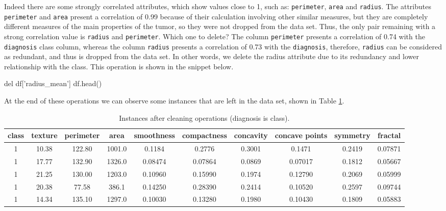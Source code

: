 \documentclass[11pt]{article}
\begin{document}
Indeed there are some strongly correlated attributes, which show values close to 1, such as: \verb$perimeter$, \verb$area$ and \verb$radius$. The attributes \verb$perimeter$ and \verb$area$ present a correlation of 0.99 because of their calculation involving other similar measures, but they are completely different measures of the main properties of the tumor, so they were not dropped from the data set. Thus, the only pair remaining with a strong correlation value is \verb$radius$ and \verb$perimeter$. Which one to delete? The column \verb$perimeter$ presents a correlation of 0.74 with the \verb$diagnosis$ class column, whereas the column \verb$radius$ presents a correlation of 0.73 with the \verb$diagnosis$, therefore, \verb$radius$ can be considered as redundant, and thus is dropped from the data set. In other words, we delete the radius attribute due to its redundancy and lower relationship with the class. This operation is shown in the snippet below.
\\

\begin{python}
del df['radius_mean']
df.head()
\end{python}

At the end of these operations we can observe some instances that are left in the data set, shown in Table \ref{tab:head}.

\begin{center}
\begin{table}
\footnotesize
\begin{tabular}{ |c|c|c|c|c|c|c|c|c|c| } 

\hline
class & texture & perimeter & area & smoothness & compactness & concavity & concave points & symmetry & fractal\\
\hline
1 & 10.38 & 122.80 & 1001.0 & 0.1184 & 0.2776 & 0.3001 & 0.1471 & 0.2419 & 0.07871 \\ 
1 & 17.77 & 132.90 & 1326.0 & 0.08474 & 0.07864 & 0.0869 & 0.07017 & 0.1812 & 0.05667 \\
1 & 21.25 & 130.00 & 1203.0 & 0.10960 & 0.15990 & 0.1974 & 0.12790 & 0.2069 & 0.05999 \\
1 & 20.38 & 77.58 & 386.1 & 0.14250 & 0.28390 & 0.2414 & 0.10520 & 0.2597 & 0.09744 \\
1 & 14.34 & 135.10 & 1297.0 & 0.10030 & 0.13280 & 0.1980 & 0.10430 & 0.1809 & 0.05883 \\
\hline

\end{tabular}
\caption{\label{tab:head}Instances after cleaning operations (diagnosis is class).}
\end{table}
\end{center}
\end{document}

